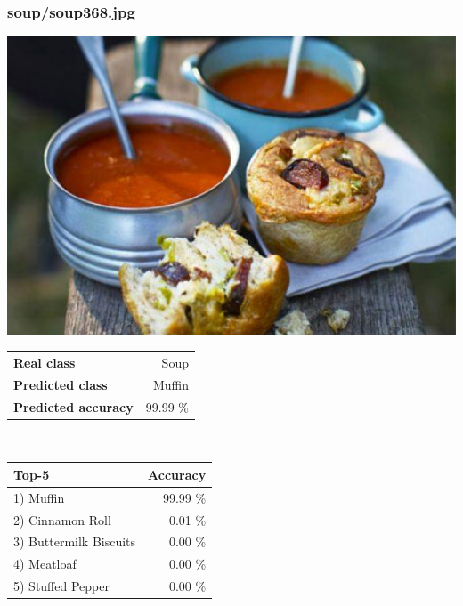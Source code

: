 \subsubsection{soup/soup368.jpg}

\begin{minipage}[t]{0.4\textwidth}
	\vspace{0pt}
	\includegraphics[width=\linewidth]{images/evaluation-images/soup/soup368.jpg}
\end{minipage}
\hfill
\begin{minipage}[t]{0.5\textwidth}
	\vspace{0pt}\raggedright
	\begin{tabularx}{\textwidth}{X r}
		\small \textbf{Real class} & \small Soup\\
		\small \textbf{Predicted class} & \small Muffin\\
		\small \textbf{Predicted accuracy} & \small 99.99 \%
    \end{tabularx}\\
    
    \vspace{6pt}
	\begin{tabularx}{\textwidth}{X r}
        \small \textbf{Top-5} & \small \textbf{Accuracy} \\
        \hline
		\small 1) Muffin & \small 99.99 \%\\\small 2) Cinnamon Roll & \small 0.01 \%\\\small 3) Buttermilk Biscuits & \small 0.00 \%\\\small 4) Meatloaf & \small 0.00 \%\\\small 5) Stuffed Pepper & \small 0.00 \%
    \end{tabularx}
\end{minipage}
    
